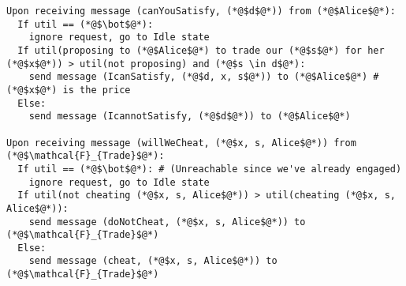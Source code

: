 \begin{lstlisting}[label=satprot, style=numbers]
Upon receiving message (canYouSatisfy, (*@$d$@*)) from (*@$Alice$@*):
  If util == (*@$\bot$@*):
    ignore request, go to Idle state
  If util(proposing to (*@$Alice$@*) to trade our (*@$s$@*) for her (*@$x$@*)) > util(not proposing) and (*@$s \in d$@*):
    send message (IcanSatisfy, (*@$d, x, s$@*)) to (*@$Alice$@*) # (*@$x$@*) is the price
  Else:
    send message (IcannotSatisfy, (*@$d$@*)) to (*@$Alice$@*)

Upon receiving message (willWeCheat, (*@$x, s, Alice$@*)) from (*@$\mathcal{F}_{Trade}$@*):
  If util == (*@$\bot$@*): # (Unreachable since we've already engaged)
    ignore request, go to Idle state
  If util(not cheating (*@$x, s, Alice$@*)) > util(cheating (*@$x, s, Alice$@*)):
    send message (doNotCheat, (*@$x, s, Alice$@*)) to (*@$\mathcal{F}_{Trade}$@*)
  Else:
    send message (cheat, (*@$x, s, Alice$@*)) to (*@$\mathcal{F}_{Trade}$@*)
\end{lstlisting}
